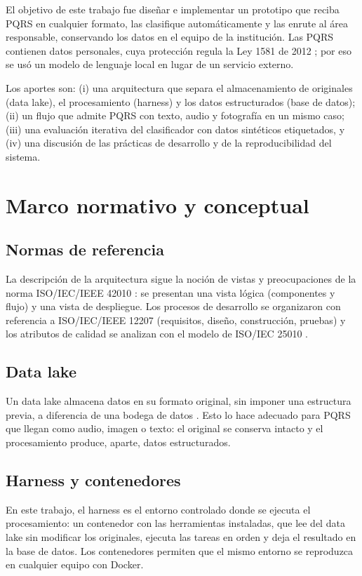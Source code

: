 \documentclass[conference]{IEEEtran}
\begin{document}
El objetivo de este trabajo fue diseñar e implementar un prototipo que reciba PQRS en cualquier formato, las clasifique automáticamente y las enrute al área responsable, conservando los datos en el equipo de la institución. Las PQRS contienen datos personales, cuya protección regula la Ley 1581 de 2012 \cite{ley1581}; por eso se usó un modelo de lenguaje local en lugar de un servicio externo.

Los aportes son: (i) una arquitectura que separa el almacenamiento de originales (data lake), el procesamiento (harness) y los datos estructurados (base de datos); (ii) un flujo que admite PQRS con texto, audio y fotografía en un mismo caso; (iii) una evaluación iterativa del clasificador con datos sintéticos etiquetados, y (iv) una discusión de las prácticas de desarrollo y de la reproducibilidad del sistema.

\section{Marco normativo y conceptual}
\subsection{Normas de referencia}
La descripción de la arquitectura sigue la noción de vistas y preocupaciones de la norma ISO/IEC/IEEE 42010 \cite{iso42010}: se presentan una vista lógica (componentes y flujo) y una vista de despliegue. Los procesos de desarrollo se organizaron con referencia a ISO/IEC/IEEE 12207 \cite{iso12207} (requisitos, diseño, construcción, pruebas) y los atributos de calidad se analizan con el modelo de ISO/IEC 25010 \cite{iso25010}.

\subsection{Data lake}
Un data lake almacena datos en su formato original, sin imponer una estructura previa, a diferencia de una bodega de datos \cite{dixon}. Esto lo hace adecuado para PQRS que llegan como audio, imagen o texto: el original se conserva intacto y el procesamiento produce, aparte, datos estructurados.

\subsection{Harness y contenedores}
En este trabajo, el harness es el entorno controlado donde se ejecuta el procesamiento: un contenedor con las herramientas instaladas, que lee del data lake sin modificar los originales, ejecuta las tareas en orden y deja el resultado en la base de datos. Los contenedores \cite{docker} permiten que el mismo entorno se reproduzca en cualquier equipo con Docker.
\end{document}
